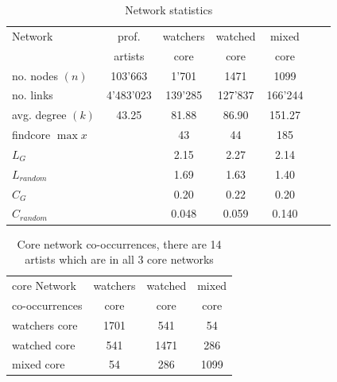 \begin{table}[htb]
    \centering
    \begin{tabular}
        { | l | c | c | c | c | c | c|} 
        \hline
        Network &  prof.  & watchers & watched & mixed\\
	            &  artists & core & core & core \\
        \hline
	no. nodes $(n)$& 103'663 & 1'701 & 1471 & 1099 \\
	no. links & 4'483'023 & 139'285 & 127'837  & 166'244 \\
	avg. degree $(k)$& 43.25 & 81.88 & 86.90 & 151.27 \\
	findcore $\max x$ & & 43 & 44 & 185\\
	$L_G$ & & 2.15 & 2.27 & 2.14 \\
	$L_{random}$ & & 1.69 & 1.63 & 1.40 \\
	$C_G$ & & 0.20 & 0.22 & 0.20 \\
	$C_{random}$ & & 0.048 & 0.059 & 0.140 \\
	\hline
    \end{tabular}
    \caption{Network statistics}
    \label{tab:netstatistics}
\end{table}
\begin{table}[htb]
    \centering
    \begin{tabular}
        { | l | c | c | c |} 
        \hline
        core Network & watchers & watched & mixed\\
        co-occurrences  &   core & core & core \\
        \hline
        watchers core & 1701 &541& 54\\
        watched core & 541 &1471& 286\\
        mixed core  &54 &286 &1099\\
	\hline
    \end{tabular}
    \caption{Core network co-occurrences, there are 14 artists which are in all 3 core networks}
    \label{tab:netcooccurrences}
\end{table}

